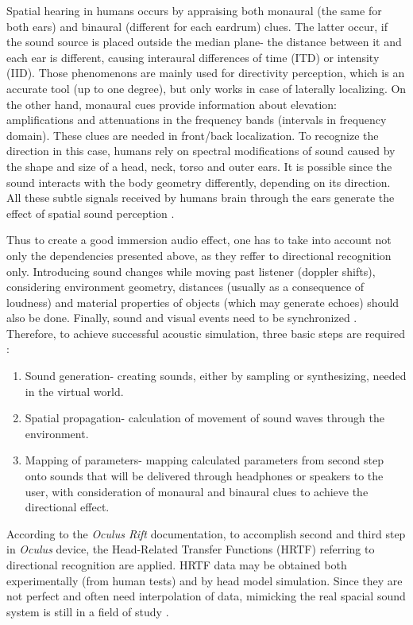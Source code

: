 Spatial hearing in humans occurs by appraising both monaural (the same for both ears) and binaural (different for each eardrum) clues. The latter occur, if the sound source is placed outside the median plane- the distance between it and each ear is different, causing interaural differences of time (ITD) or intensity (IID). Those phenomenons are mainly used for directivity perception, which is an accurate tool (up to one degree), but only works in case of laterally localizing. On the other hand, monaural cues provide information about elevation: amplifications and attenuations in the frequency bands (intervals in frequency domain). These clues are needed in front/back localization. To recognize the direction in this case, humans rely on spectral modifications of sound caused by the shape and size of a head, neck, torso and outer ears. It is possible since the sound interacts with the body geometry differently, depending on its direction. All these subtle signals received by humans brain through the ears generate the effect of spatial sound perception \cite{Mazuryk96, Gobbetti99, Oculus16}. 

Thus to create a good immersion audio effect, one has to take into account not only the dependencies presented above, as they reffer to directional recognition only. Introducing sound changes while moving past listener (doppler shifts), considering environment geometry, distances (usually as a consequence of loudness) and material properties of objects (which may generate echoes) should also be done. Finally, sound and visual events need to be synchronized \cite{Mazuryk96, Gobbetti99}.
Therefore, to achieve successful acoustic simulation, three basic steps are required \cite{Mazuryk96}:
\begin{enumerate}
\item Sound generation- creating sounds, either by sampling or synthesizing, needed in the virtual world.
\item Spatial propagation- calculation of movement of sound waves through the environment.
\item Mapping of parameters- mapping calculated parameters from second step onto sounds that will be delivered through headphones or speakers to the user, with consideration of monaural and binaural clues to achieve the directional effect.
\end{enumerate}

According to the \textit{Oculus Rift} documentation, to accomplish second and third step in \textit{Oculus} device, the Head-Related Transfer Functions (HRTF) referring to directional recognition are applied. HRTF data may be obtained both experimentally (from human tests) and by head model simulation. Since they are not perfect and often need interpolation of data, mimicking the real spacial sound system is still in a field of study \cite{Oculus16}.
